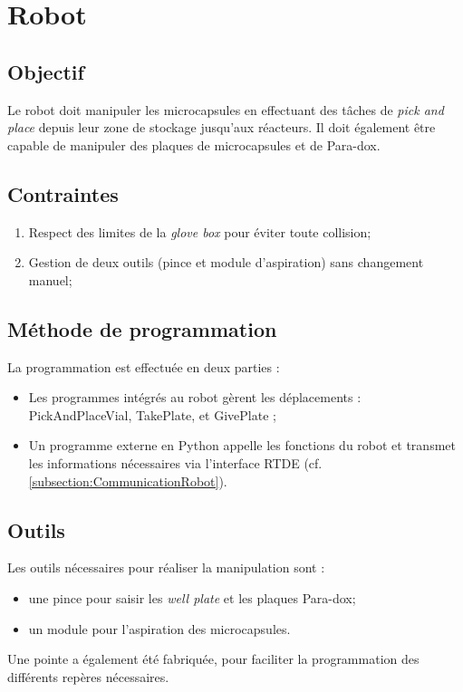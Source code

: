 \section{Robot}

\subsection{Objectif}
Le robot doit manipuler les microcapsules en effectuant des tâches de \textit{pick and place} depuis leur zone de stockage jusqu'aux réacteurs. Il doit également être capable de manipuler des plaques de microcapsules et de \og{}Para-dox\fg{}.

\subsection{Contraintes}
\begin{enumerate}
    \item Respect des limites de la \textit{glove box} pour éviter toute collision;
    \item Gestion de deux outils (pince et module d'aspiration) sans changement manuel;
\end{enumerate}

\subsection{Méthode de programmation}
La programmation est effectuée en deux parties :
\begin{itemize}
    \item Les programmes intégrés au robot gèrent les déplacements : \og{}PickAndPlaceVial\fg{}, \og{}TakePlate\fg{}, et \og{}GivePlate\fg{} ;
    \item Un programme externe en Python appelle les fonctions du robot et transmet les informations nécessaires via l'interface RTDE (cf. \autoref{subsection:CommunicationRobot}).
\end{itemize}

\subsection{Outils}
Les outils nécessaires pour réaliser la manipulation sont :
\begin{itemize}
    \item une pince pour saisir les \textit{well plate} et les plaques \og{}Para-dox\fg{};
    \item un module pour l'aspiration des microcapsules.
\end{itemize}
Une pointe a également été fabriquée, pour faciliter la programmation des différents repères nécessaires.

